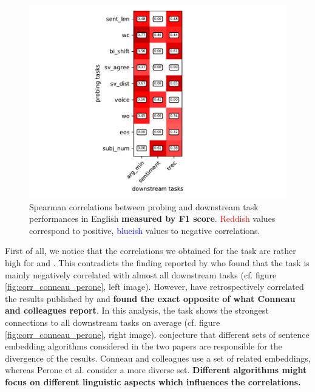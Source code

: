 \begin{figure}[h]
	\centering
	\includegraphics[scale=0.65]{images/spearman_corr_en_f1}
	\caption[Spearman correlations between probing and downstream task performances in English (F1 scores)]
		{Spearman correlations between probing and downstream task performances in English 
		\textbf{measured by F1 score}. \textcolor{red}{Reddish} values correspond to positive, \textcolor{blue}{blueish} values
		to negative correlations.}
	\label{fig:sp_corr_probing_downstream_en_f1}
\end{figure}

First of all, we notice that the correlations we obtained for the  task are rather high for  and . This contradicts the finding reported by \citep{Conneau.2018a} who found that the  task is mainly negatively correlated with almost all downstream tasks (cf. figure \vref{fig:corr_conneau_perone}, left image). However, \citep{Eger.2019} have retrospectively correlated the results published by \citep{Perone.2018} and \textbf{found the exact opposite of what Conneau and colleagues report}. In this analysis, the  task shows the strongest connections to all downstream tasks on average (cf. figure \vref{fig:corr_conneau_perone}, right image). \citep{Eger.2019} conjecture that different sets of sentence embedding algorithms considered in the two papers are responsible for the divergence of the results. Conneau and colleagues use a set of related embeddings, whereas Perone et al. consider a more diverse set. \textbf{Different algorithms might focus on different linguistic aspects which influences the correlations.}

